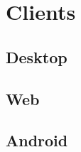 \section{Clients}
\subsection{Desktop}
\FloatBarrier

\subsection{Web}

\FloatBarrier
\subsection{Android}
